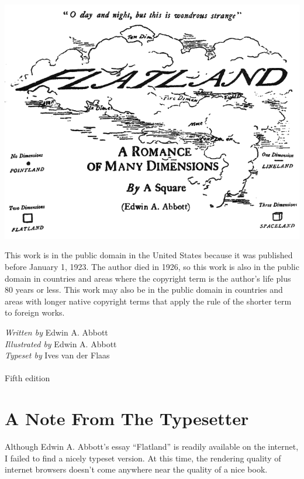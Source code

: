 \documentclass[12pt, a4paper, oneside]{memoir}
\begin{document}

\thispagestyle{empty} 
\begin{vplace}[0.5]
\includegraphics[trim=0mm 0mm 0mm 0mm,width=\linewidth]{flatland_cover}
\end{vplace}

\clearpage

\frontmatter
This work is in the public domain in the United States because it was
published before January 1, 1923.
The author died in 1926, so this work is also in the public domain in
countries and areas where the copyright term is the author's life plus 80
years or less. This work may also be in the public domain in countries and
areas with longer native copyright terms that apply the rule of the shorter
term to foreign works.
\vspace{5mm}

\noindent\emph{Written by} Edwin A. Abbott \\
\emph{Illustrated by} Edwin A. Abbott \\
\emph{Typeset by} Ives van der Flaas\\ \\
\null
\vfill
Fifth edition
\chapter*{A Note From The Typesetter}
Although Edwin A. Abbott's essay ``Flatland'' is readily available on the
internet, I failed to find a nicely typeset version. At this time,
the rendering quality of internet browsers doesn't come anywhere near the
quality of a nice book. 
\end{document}
